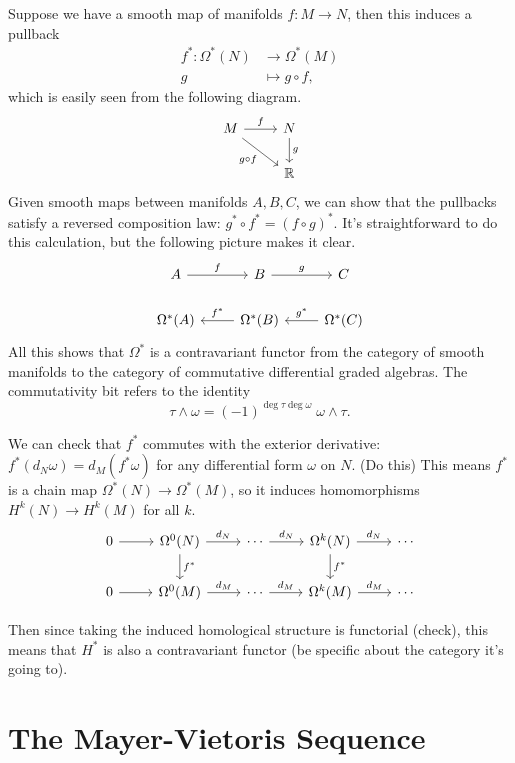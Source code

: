 \documentclass[twoside,10pt]{report}
\begin{document}
Suppose we have a smooth map of manifolds $f:M\to N$, then this induces a pullback
\begin{align*}
	f^{*}:\Omega^{*}(N)&\to \Omega^{*}(M)\\
	g&\mapsto g\circ f,
\end{align*}
which is easily seen from the following diagram.
\[
\begin{tikzcd}
	M\rar{f}\arrow[dr,"g\circ f"']&N\dar{g}\\
				     &\mathbb{R}
\end{tikzcd}
\]
Given smooth maps between manifolds $A,B,C$, we can show that the pullbacks satisfy a reversed composition law: $g^{*}\circ f^{*}=(f\circ g)^{*}$. {\color{red}It's straightforward} to do this calculation, but the following picture makes it clear.
\[
\begin{tikzcd}
	A\rar{f}&B\rar{g}&C\\
	\Omega^{*}(A)&\Omega^{*}(B)\arrow[l,"f^{*}"']&\Omega^{*}(C)\arrow[l,"g^{*}"']
\end{tikzcd}
\] All this shows that $\Omega^{*}$ is a contravariant functor from the category of smooth manifolds to the category of commutative differential graded algebras. The commutativity bit refers to the identity
\[
	\tau \wedge \omega = (-1)^{\deg \tau \deg \omega} \; \omega \wedge \tau.
\] 

We can check that $f^{*}$ commutes with the exterior derivative: $f^{*}(d_{N}\omega) = d_{M}(f^{*}\omega)$ for any differential form $\omega$ on $N$. {\color{red}(Do this)} This means $f^{*}$ is a chain map $\Omega^{*}(N) \to \Omega^{*}(M)$, so it induces homomorphisms $H^{k}(N)\to H^{k}(M)$ for all $k$.
\[
\begin{tikzcd}
	0\rar&\Omega^{0}(N)\rar{d_{N}}\dar{f^{*}}&\cdots\rar{d_{N}}&\Omega^{k}(N)\rar{d_{N}}\dar{f^{*}}&\cdots\\
	0\rar&\Omega^{0}(M)\rar{d_{M}}&\cdots\rar{d_{M}}&\Omega^{k}(M)\rar{d_{M}}&\cdots
\end{tikzcd}
\] 

Then since taking the induced homological structure is functorial {\color{red}(check)}, this means that $H^{*}$ is also a contravariant functor {\color{red}(be specific about the category it's going to)}.


\section{The Mayer-Vietoris Sequence}
\end{document}
